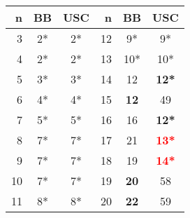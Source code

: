 \begin{table}[t]\scriptsize
\begin{tabular}{r|c|c||r|c|c}
 \hline
 n&BB &USC&n&BB&USC\\
 \hline
 3&2*&2*&12&9*&9*\\
 4&2*&2*&13&10*&10*\\
 5&3*&3*&14&12&\textbf{12*}\\
 6&4*&4*&15&\textbf{12}&49\\
 7&5*&5*&16&16&\textbf{12*}\\
 8&7*&7*&17&21&\textbf{\textcolor{red}{13*}}\\
 9&7*&7*&18&19&\textbf{\textcolor{red}{14*}}\\
 10&7*&7*&19&\textbf{20}&58\\
 11&8*&8*&20&\textbf{22}&59\\
\end{tabular}
\end{table} 